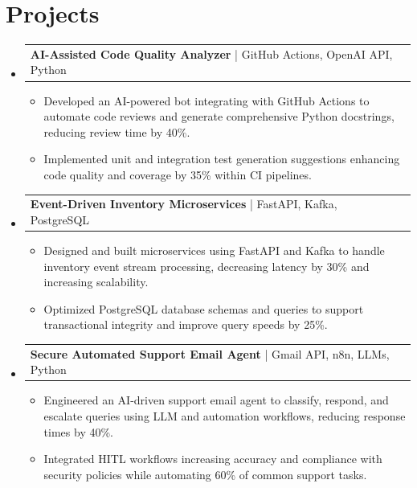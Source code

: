 \documentclass[letterpaper,11pt]{article}
\makeatletter
\newcommand{\resumeItem}[1]{
  \item\footnotesize{
    {#1 \vspace{-2pt}}
  }
}
\newcommand{\resumeProjectHeading}[2]{
    \item
    \begin{tabular*}{1.001\textwidth}{l@{\extracolsep{\fill}}r}
      \small#1 & \textbf{\small #2}\\
    \end{tabular*}\vspace{-7pt}
}
\newcommand{\resumeSubHeadingListStart}{\begin{itemize}[leftmargin=0pt, label={}]}
\newcommand{\resumeSubHeadingListEnd}{\end{itemize}}
\newcommand{\resumeItemListStart}{\begin{itemize}[leftmargin=*]}
\newcommand{\resumeItemListEnd}{\end{itemize}\vspace{-5pt}}
\makeatother
\begin{document}
\section{Projects}
    \vspace{-5pt}
    \resumeSubHeadingListStart
      \resumeProjectHeading
          {\textbf{AI-Assisted Code Quality Analyzer} | GitHub Actions, OpenAI API, Python}{}
          \resumeItemListStart
              \resumeItem{Developed an AI-powered bot integrating with GitHub Actions to automate code reviews and generate comprehensive Python docstrings, reducing review time by 40\%.}
              \resumeItem{Implemented unit and integration test generation suggestions enhancing code quality and coverage by 35\% within CI pipelines.}
          \resumeItemListEnd
          \vspace{-12pt}
      \resumeProjectHeading
          {\textbf{Event-Driven Inventory Microservices} | FastAPI, Kafka, PostgreSQL}{}
          \resumeItemListStart
              \resumeItem{Designed and built microservices using FastAPI and Kafka to handle inventory event stream processing, decreasing latency by 30\% and increasing scalability.}
              \resumeItem{Optimized PostgreSQL database schemas and queries to support transactional integrity and improve query speeds by 25\%.}
          \resumeItemListEnd
          \vspace{-12pt}
      \resumeProjectHeading
          {\textbf{Secure Automated Support Email Agent} | Gmail API, n8n, LLMs, Python}{}
          \resumeItemListStart
              \resumeItem{Engineered an AI-driven support email agent to classify, respond, and escalate queries using LLM and automation workflows, reducing response times by 40\%.}
              \resumeItem{Integrated HITL workflows increasing accuracy and compliance with security policies while automating 60\% of common support tasks.}
          \resumeItemListEnd 
    \resumeSubHeadingListEnd
\end{document}
